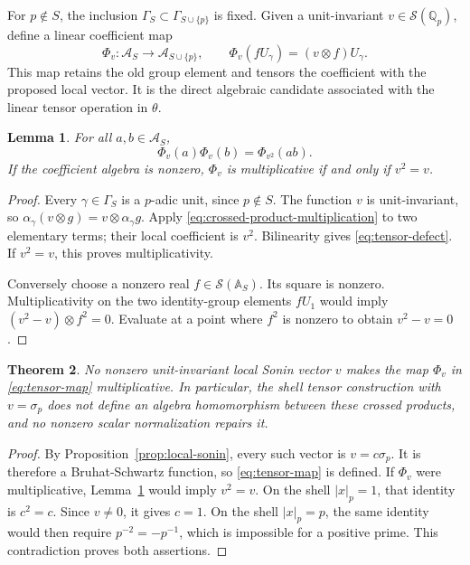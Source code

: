 \documentclass[11pt,letterpaper]{article}
\newtheorem{theorem}{Theorem}[section]
\newtheorem{lemma}[theorem]{Lemma}
\theoremstyle{definition}
\theoremstyle{remark}
\newcommand{\Q}{\mathbb Q}
\newcommand{\Sch}{\mathcal S}
\begin{document}
For $p\notin S$, the inclusion $\Gamma_S\subset\Gamma_{S\cup\{p\}}$
is fixed. Given a unit-invariant $v\in\Sch(\Q_p)$, define a linear
coefficient map
\begin{equation}\label{eq:tensor-map}
 \Phi_v:\mathcal A_S\longrightarrow\mathcal A_{S\cup\{p\}},
 \qquad \Phi_v(fU_\gamma)=(v\otimes f)U_\gamma.
\end{equation}
This map retains the old group element and tensors the coefficient
with the proposed local vector. It is the direct algebraic candidate
associated with the linear tensor operation in $\theta$.

\begin{lemma}\label{lem:tensor-multiplication}
For all $a,b\in\mathcal A_S$,
\begin{equation}\label{eq:tensor-defect}
 \Phi_v(a)\Phi_v(b)=\Phi_{v^2}(ab).
\end{equation}
If the coefficient algebra is nonzero, $\Phi_v$ is multiplicative
if and only if $v^2=v$.
\end{lemma}

\begin{proof}
Every $\gamma\in\Gamma_S$ is a $p$-adic unit, since $p\notin S$.
The function $v$ is unit-invariant, so
$\alpha_\gamma(v\otimes g)=v\otimes\alpha_\gamma g$.
Apply \eqref{eq:crossed-product-multiplication} to two elementary
terms; their local coefficient is $v^2$. Bilinearity gives
\eqref{eq:tensor-defect}. If $v^2=v$, this proves multiplicativity.

Conversely choose a nonzero real $f\in\Sch(\mathbb A_S)$.
Its square is nonzero. Multiplicativity on the two identity-group
elements $fU_1$ would imply
$(v^2-v)\otimes f^2=0$. Evaluate at a point where $f^2$ is nonzero
to obtain $v^2-v=0$.
\end{proof}

\begin{theorem}\label{thm:local-correspondence:tensor-obstruction}
No nonzero unit-invariant local Sonin vector $v$ makes the map
$\Phi_v$ in \eqref{eq:tensor-map} multiplicative. In particular,
the shell tensor construction with $v=\sigma_p$ does not define
an algebra homomorphism between these crossed products, and no
nonzero scalar normalization repairs it.
\end{theorem}

\begin{proof}
By Proposition~\ref{prop:local-sonin}, every such vector is $v=c\sigma_p$.
It is therefore a Bruhat-Schwartz function, so
\eqref{eq:tensor-map} is defined. If $\Phi_v$ were multiplicative,
Lemma~\ref{lem:tensor-multiplication} would imply $v^2=v$.
On the shell $|x|_p=1$, that identity is $c^2=c$.
Since $v\ne0$, it gives $c=1$. On the shell $|x|_p=p$,
the same identity would then require $p^{-2}=-p^{-1}$,
which is impossible for a positive prime. This contradiction proves
both assertions.
\end{proof}
\end{document}
